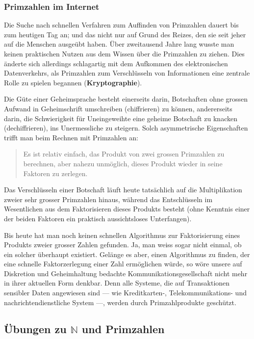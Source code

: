 \documentclass[%
11pt,%
twoside,%
titlepage,%
german,%
headsepline%
]{scrartcl}
\begin{document}
\subsubsection{Primzahlen im Internet}

Die Suche nach schnellen Verfahren zum Auffinden von Primzahlen dauert bis zum heutigen Tag an; und das nicht nur auf Grund des Reizes, den sie seit jeher auf die Menschen ausgeübt haben. Über zweitausend Jahre lang wusste man keinen praktischen Nutzen aus dem Wissen über die Primzahlen zu ziehen. Dies änderte sich allerdings schlagartig mit dem Aufkommen des elektronischen Datenverkehrs, als Primzahlen zum Verschlüsseln von Informationen eine zentrale Rolle zu spielen begannen (\textbf{Kryptographie}).

Die Güte einer Geheimsprache besteht einerseits darin, Botschaften ohne grossen Aufwand in Geheimschrift umschreiben (chiffrieren) zu können, andererseits darin, die Schwierigkeit für Uneingeweihte eine geheime Botschaft zu knacken (dechiffrieren), ins Unermessliche zu steigern. Solch asymmetrische Eigenschaften trifft man beim Rechnen mit Primzahlen an:
\begin{quote}
Es ist relativ einfach, das Produkt von zwei grossen Primzahlen zu berechnen, aber nahezu unmöglich, dieses Produkt wieder in seine Faktoren zu zerlegen.
\end{quote}
Das Verschlüsseln einer Botschaft läuft heute tatsächlich auf die Multiplikation zweier sehr grosser Primzahlen hinaus, während das Entschlüsseln im Wesentlichen aus dem Faktorisieren dieses Produkts besteht (ohne Kenntnis einer der beiden Faktoren ein praktisch aussichtsloses Unterfangen).

Bis heute hat man noch keinen schnellen Algorithmus zur Faktorisierung eines Produkts zweier grosser Zahlen gefunden. Ja, man weiss sogar nicht einmal, ob ein solcher überhaupt existiert. Gelänge es aber, einen Algorithmus zu finden, der eine schnelle Faktorzerlegung einer Zahl ermöglichen würde, so wöre unsere auf Diskretion und Geheimhaltung bedachte Kommunikationsgesellschaft nicht mehr in ihrer aktuellen Form denkbar. Denn alle Systeme, die auf Transaktionen sensibler Daten angewiesen sind --- wie Kreditkarten-, Telekommunikations- und nachrichtendienstliche System ---, werden durch Primzahlprodukte geschützt.

\subsection{Übungen zu $\mathbb{N}$ und Primzahlen}
\end{document}
